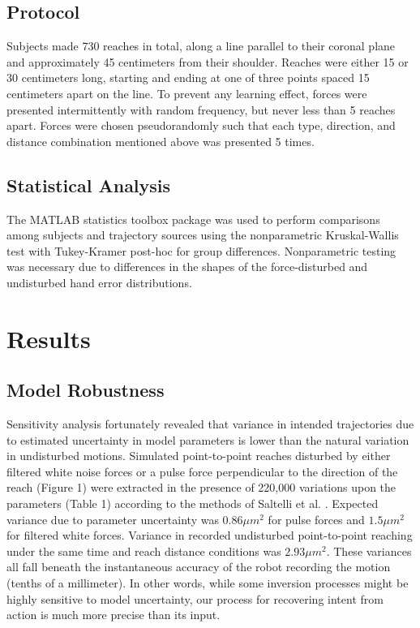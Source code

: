 \documentclass[10pt]{article}
\begin{document}
\subsection*{Protocol}
Subjects made 730 reaches in total, along a line parallel to their coronal plane and approximately 45 centimeters from their shoulder. Reaches were either 15 or 30 centimeters long, starting and ending at one of three points spaced 15 centimeters apart on the line. To prevent any learning effect, forces were presented intermittently with random frequency, but never less than 5 reaches apart. Forces were chosen pseudorandomly such that each type, direction, and distance combination mentioned above was presented 5 times.  

\subsection*{Statistical Analysis}
The MATLAB statistics toolbox package \cite{MATLAB:2008} was used to perform comparisons among subjects and trajectory sources using the nonparametric Kruskal-Wallis test with Tukey-Kramer post-hoc for group differences. Nonparametric testing was necessary due to differences in the shapes of the force-disturbed and undisturbed hand error distributions.


\section*{Results}

\subsection*{Model Robustness}
Sensitivity analysis fortunately revealed that variance in intended trajectories due to estimated uncertainty in model parameters is lower than the natural variation in undisturbed motions.  Simulated point-to-point reaches disturbed by either filtered white noise forces or a pulse force perpendicular to the direction of the reach (Figure 1) were extracted in the presence of 220,000 variations upon the parameters (Table 1) according to the methods of Saltelli et al. \cite{saltelli2010variance}. Expected variance due to parameter uncertainty was $0.86  \mu m^2$ for pulse forces and $1.5 \mu m^2$ for filtered white forces. Variance in recorded undisturbed point-to-point reaching under the same time and reach distance conditions was $2.93 \mu m^2$. These variances all fall beneath the instantaneous accuracy of the robot recording the motion (tenths of a millimeter). In other words, while some inversion processes might be highly sensitive to model uncertainty, our process for recovering intent from action is much more precise than its input.
\end{document}
